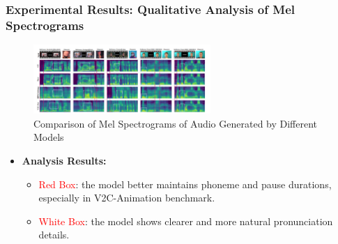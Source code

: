 \begin{frame}
\frametitle{Experimental Results: Qualitative Analysis of Mel Spectrograms}
\begin{figure}
\centering
\includegraphics[width=0.6\textwidth]{figs/analysis.png} %
\caption{Comparison of Mel Spectrograms of Audio Generated by Different Models}
\end{figure}

\begin{itemize}
\item \textbf{Analysis Results:}
    \begin{itemize}
    \item \textcolor{red}{Red Box}: the model better maintains phoneme and pause durations, especially in V2C-Animation benchmark.
    \item \textcolor{red}{White Box}: the model shows clearer and more natural pronunciation details.
    \end{itemize}
\end{itemize}
\end{frame}




